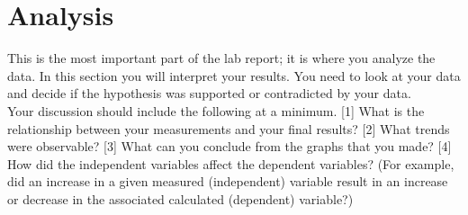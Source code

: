 \documentclass[12pt]{article}
\begin{document}
%
%
%
%
%
%
%
%
%
%
%


\section{Analysis}
	This is the most important part of the lab report; it is where you
analyze the data. In this section you will interpret your results. You need to look at your data and decide if the hypothesis was supported or contradicted by your data.  \\ %
    
    Your discussion should include the following at a minimum. [1] What is the relationship between your measurements and your final results? [2] What trends were observable? [3] What can you conclude from the graphs that you made? [4] How did the independent variables affect the dependent variables? (For example, did an increase in a given measured (independent) variable result in an increase or decrease in the associated calculated (dependent) variable?) \\ 
\end{document}
